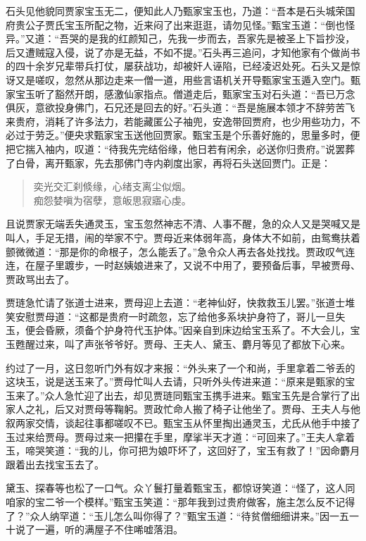 \documentclass[12pt,oneside]{book}
\newenvironment{shici}{%
\begin{verse}%
\centering\large\hspace{12pt}}%
{\end{verse}}
\begin{document}
石头见他貌同贾家宝玉无二，便知此人乃甄家宝玉也，乃道：“吾本是石头城荣国府贵公子贾氏宝玉所配之物，近来闷了出来逛逛，请勿见怪。”甄宝玉道：“倒也怪异。”又道：“吾哭的是我的红颜知己，先我一步而去，吾家先是被圣上下旨抄没，后又遭贼寇入侵，说了亦是无益，不如不提。”石头再三追问，才知他家有个做尚书的四十余岁兄辈带兵打仗，屡获战功，却被奸人诬陷，已经凌迟处死。石头又是惊讶又是嗟叹，忽然从那边走来一僧一道，用些言语机关开导甄家宝玉遁入空门。甄家宝玉听了豁然开朗，感激仙家指点。僧道走后，甄家宝玉对石头道：“吾已万念俱灰，意欲投身佛门，石兄还是回去的好。”石头道：“吾是施展本领才不辞劳苦飞来贵府，消耗了许多法力，若能藏匿公子袖兜，安逸带回贾府，也少用些功力，不必过于劳乏。”便央求甄家宝玉送他回贾家。甄宝玉是个乐善好施的，思量多时，便把它揣入袖内，叹道：“待我先完结俗缘，他日若有闲余，必送你归贵府。”说罢葬了白骨，离开甄家，先去那佛门寺内剃度出家，再将石头送回贾门。正是：

\begin{shici}
奕光交汇刹倐缘，心绪支离尘似烟。\\
痴怨婪嗔为宿孽，意皈思寂寤心虔。
\end{shici}


且说贾家无端丢失通灵玉，宝玉忽然神志不清、人事不醒，急的众人又是哭喊又是叫人，手足无措，闹的举家不宁。贾母近来体弱年高，身体大不如前，由鸳鸯扶着颤微微道：“那是你的命根子，怎么能丢了。”急令众人再去各处找找。贾政叹气连连，在屋子里踱步，一时赵姨娘进来了，又说不中用了，要预备后事，早被贾母、贾政骂出去了。

贾琏急忙请了张道士进来，贾母迎上去道：“老神仙好，快救救玉儿罢。”张道士堆笑安慰贾母道：“这都是贵府一时疏忽，忘了给他多系块护身符了，哥儿一旦失玉，便会昏厥，须备个护身符代玉护体。”因亲自到床边给宝玉系了。不大会儿，宝玉甦醒过来，叫了声张爷爷好。贾母、王夫人、黛玉、麝月等见了都放下心来。

约过了一月，这日忽听门外有奴才来报：“外头来了一个和尚，手里拿着二爷丢的这块玉，说是送玉来了。”贾母忙叫人去请，只听外头传进来道：“原来是甄家的宝玉来了。”众人急忙迎了出去，却见贾琏同甄宝玉携手进来。甄宝玉先是合掌行了出家人之礼，后又对贾母等鞠躬。贾政忙命人搬了椅子让他坐了。贾母、王夫人与他叙两家交情，谈起往事都嗟叹不已。甄宝玉从怀里掏出通灵玉，尤氏从他手中接了玉过来给贾母。贾母过来一把攥在手里，摩挲半天才道：“可回来了。”王夫人拿着玉，啼哭笑道：“我的儿，你可把为娘吓坏了，这回好了，宝玉有救了！”因命麝月跟着出去找宝玉去了。

黛玉、探春等也松了一口气。众丫鬟打量着甄宝玉，都惊讶笑道：“怪了，这人同咱家的宝二爷一个模样。”甄宝玉笑道：“那年我到过贵府做客，施主怎么反不记得了？”众人纳罕道：“玉儿怎么叫你得了？”甄宝玉道：“待贫僧细细讲来。”因一五一十说了一遍，听的满屋子不住唏嘘落泪。
\end{document}
